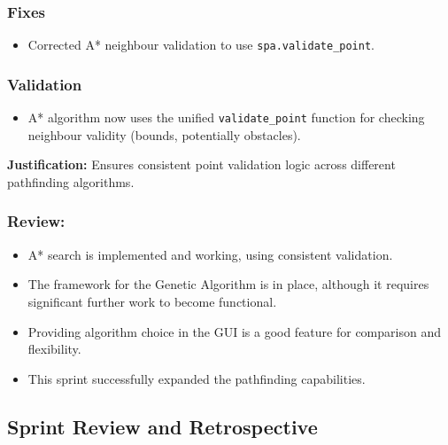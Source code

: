 \subsubsection{Fixes}
\begin{itemize}
	\item Corrected A* neighbour validation to use \verb|spa.validate_point|.
\end{itemize}

\subsubsection{Validation}
\begin{itemize}
	\item A* algorithm now uses the unified \verb|validate_point| function for checking neighbour validity (bounds, potentially obstacles).
\end{itemize}
\textbf{Justification:} Ensures consistent point validation logic across different pathfinding algorithms.

\subsubsection{Review:}
\begin{itemize}
	\item A* search is implemented and working, using consistent validation.
	\item The framework for the Genetic Algorithm is in place, although it requires significant further work to become functional.
	\item Providing algorithm choice in the GUI is a good feature for comparison and flexibility.
	\item This sprint successfully expanded the pathfinding capabilities.
\end{itemize}

\clearpage
\subsection{Sprint Review and Retrospective}

